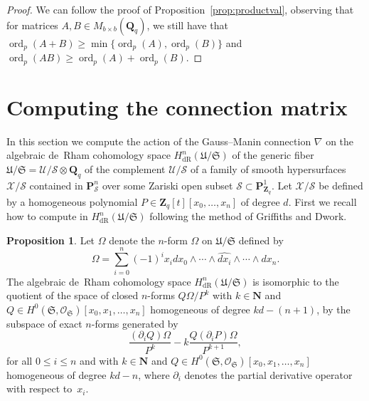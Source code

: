 \documentclass[a4paper,11pt]{article}
\numberwithin{equation}{section}
\newcommand{\NN}{\mathbf{N}} %
\newcommand{\ZZ}{\mathbf{Z}} %
\newcommand{\QQ}{\mathbf{Q}} %
\DeclareMathOperator{\ord}{ord}          %
\providecommand{\HdR}{H_{\text{dR}}}    %
\theoremstyle{definition}
\newtheorem{prop}[thm]{Proposition}
\begin{document}
\begin{proof}
We can follow the proof of Proposition~\ref{prop:productval}, 
observing that for matrices $A,B \in M_{b \times b}(\QQ_q)$, we still 
have that $\ord_p(A + B) \geq \min \{\ord_p(A), \ord_p(B)\}$ and 
$\ord_p(AB) \geq \ord_p(A)+\ord_p(B)$.
\end{proof}

\section{Computing the connection matrix}
\label{sec:Connection}

In this section we compute the action of the Gauss--Manin connection $\nabla$ 
on the algebraic de~Rham cohomology space $\HdR^{n}(\mathfrak{U}/\mathfrak{S})$ 
of the generic fiber 
$\mathfrak{U}/\mathfrak{S}=\mathcal{U}/\mathcal{S} \otimes \QQ_q$ of the 
complement $\mathcal{U}/\mathcal{S}$ of a family of smooth hypersurfaces 
$\mathcal{X}/\mathcal{S}$ contained in $\mathbf{P}^n_{\mathcal{S}}$ over
some Zariski open subset $\mathcal{S} \subset \mathbf{P}^1_{\ZZ_q}$. Let 
$\mathcal{X}/\mathcal{S}$ be defined by a homogeneous polynomial 
$P \in \ZZ_q[t][x_0,\ldots,x_n]$ of degree $d$. First we recall how to 
compute in $\HdR^{n}(\mathfrak{U}/\mathfrak{S})$ following the method 
of Griffiths and Dwork.  

\begin{prop}
Let $\Omega$ denote the $n$-form $\Omega$ on $\mathfrak{U}/\mathfrak{S}$ 
defined by 
\begin{equation*}
\Omega = \sum_{i=0}^n (-1)^i x_i d x_0 \wedge \dotsb \wedge \widehat{d x_i} \wedge \dotsb \wedge d x_n.
\end{equation*}
The algebraic de~Rham cohomology space $\HdR^{n}(\mathfrak{U}/\mathfrak{S})$ 
is isomorphic to the quotient of the space of closed $n$-forms 
$Q \Omega / P^k$ with $k \in \NN$ and 
$Q \in H^0(\mathfrak{S},\mathcal{O}_{\mathfrak{S}})[x_0, x_1, \dotsc, x_n]$ 
homogeneous of degree $k d - (n + 1)$, by the subspace of exact $n$-forms 
generated by
\begin{equation*} 
\frac{(\partial_i Q) \Omega}{P^k} - k \frac{Q (\partial_i P) \Omega}{P^{k+1}},
\end{equation*}
for all $0 \leq i \leq n$ and with $k \in \NN$ and 
$Q \in H^0(\mathfrak{S}, \mathcal{O}_{\mathfrak{S}})[x_0, x_1, \dotsc, x_n]$ 
homogeneous of degree $kd-n$, where $\partial_i$ denotes the partial 
derivative operator with respect to~$x_i$.
\end{prop}
\end{document}
